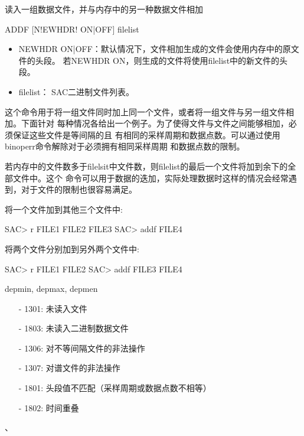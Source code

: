 \label{cmd:addf}

读入一组数据文件，并与内存中的另一种数据文件相加

\begin{SACSTX}
ADDF [N!EWHDR! ON|OFF] filelist
\end{SACSTX}

\begin{itemize}
\item NEWHDR ON|OFF：默认情况下，文件相加生成的文件会使用内存中的原文件的头段。
    若NEWHDR ON，则生成的文件将使用filelist中的新文件的头段。
\item filelist： SAC二进制文件列表。
\end{itemize}

这个命令用于将一组文件同时加上同一个文件，或者将一组文件与另一组文件相加。下面针对
每种情况各给出一个例子。为了使得文件与文件之间能够相加，必须保证这些文件是等间隔的且
有相同的采样周期和数据点数。可以通过使用binoperr命令解除对于必须拥有相同采样周期
和数据点数的限制。

若内存中的文件数多于filelsit中文件数，则filelist的最后一个文件将加到余下的全部文件中。这个
命令可以用于数据的迭加，实际处理数据时这样的情况会经常遇到，对于文件的限制也很容易满足。

将一个文件加到其他三个文件中:
\begin{SACCode}
SAC> r FILE1 FILE2 FILE3
SAC> addf FILE4
\end{SACCode}

将两个文件分别加到另外两个文件中:
\begin{SACCode}
SAC> r FILE1 FILE2
SAC> addf FILE3 FILE4
\end{SACCode}

depmin, depmax, depmen

\begin{itemize}
\item[-]1301: 未读入文件
\item[-]1803: 未读入二进制数据文件
\item[-]1306: 对不等间隔文件的非法操作
\item[-]1307: 对谱文件的非法操作
\item[-]1801: 头段值不匹配（采样周期或数据点数不相等）
\end{itemize}

\begin{itemize}
\item[-]1802: 时间重叠
\end{itemize}

、
